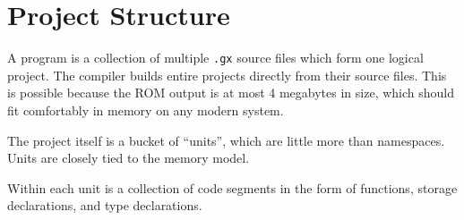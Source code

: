 \section{Project Structure}

A \gx{} program is a collection of multiple {\tt .gx} source files which
form one logical project. The \gx{} compiler builds entire projects
directly from their source files. This is possible because the ROM output
is at most 4 megabytes in size, which should fit comfortably in memory
on any modern system.

The project itself is a bucket of ``units'', which are little more than
namespaces. Units are closely tied to the memory model.

Within each unit is a collection of code segments in the form of
functions, storage declarations, and type declarations.
